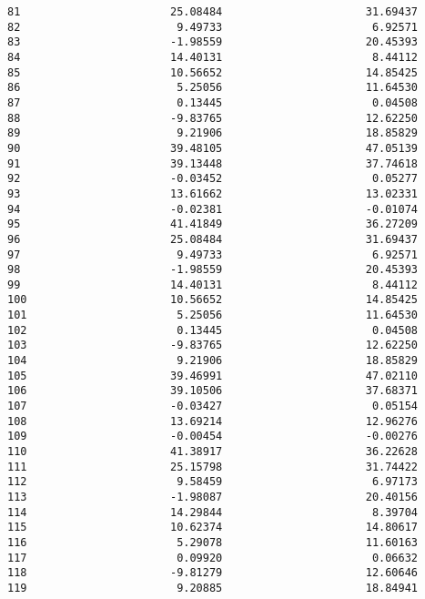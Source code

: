 \documentclass[11pt]{article}
\begin{document}
\begin{tcolorbox}[breakable, size=fbox, boxrule=.5pt, pad at break*=1mm, opacityfill=0]
\begin{Verbatim}[commandchars=\\\{\}]
81                       25.08484                      31.69437
82                        9.49733                       6.92571
83                       -1.98559                      20.45393
84                       14.40131                       8.44112
85                       10.56652                      14.85425
86                        5.25056                      11.64530
87                        0.13445                       0.04508
88                       -9.83765                      12.62250
89                        9.21906                      18.85829
90                       39.48105                      47.05139
91                       39.13448                      37.74618
92                       -0.03452                       0.05277
93                       13.61662                      13.02331
94                       -0.02381                      -0.01074
95                       41.41849                      36.27209
96                       25.08484                      31.69437
97                        9.49733                       6.92571
98                       -1.98559                      20.45393
99                       14.40131                       8.44112
100                      10.56652                      14.85425
101                       5.25056                      11.64530
102                       0.13445                       0.04508
103                      -9.83765                      12.62250
104                       9.21906                      18.85829
105                      39.46991                      47.02110
106                      39.10506                      37.68371
107                      -0.03427                       0.05154
108                      13.69214                      12.96276
109                      -0.00454                      -0.00276
110                      41.38917                      36.22628
111                      25.15798                      31.74422
112                       9.58459                       6.97173
113                      -1.98087                      20.40156
114                      14.29844                       8.39704
115                      10.62374                      14.80617
116                       5.29078                      11.60163
117                       0.09920                       0.06632
118                      -9.81279                      12.60646
119                       9.20885                      18.84941


\end{Verbatim}
\end{tcolorbox}
\end{document}
